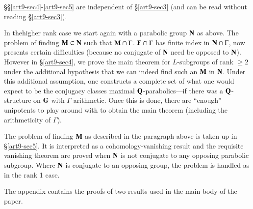\S \S \ref{art9-sec4}-\ref{art9-sec5} are independent of \S \ref{art9-sec3} (and can be read without reading \S \ref{art9-sec3}).

In the\pageoriginale higher rank case we start again with a parabolic group $\mathbf{N}$ as above. The problem of finding $\mathbf{M} \subset \mathbf{N}$ such that $\mathbf{M} \cap \Gamma$. $\mathbf{F} \cap \Gamma$ has finite index in $\mathbf{N} \cap \Gamma$, now presents certain difficulties (because no conjugate of $\mathbf{N}$ need be opposed to $\mathbf{N}$). However in \S \ref{art9-sec4},  we prove the main theorem for $L$-subgroups of rank $\geqslant 2$ under the additional hypothesis that we can indeed find such an $\mathbf{M}$ in $\mathbf{N}$. Under this additional assumption, one constructs a complete set of what one would expect to be the conjugacy classes maximal $\mathbf{Q}$-parabolics---if there was a $\mathbf{Q}$-structure on $\mathbf{G}$ with $\Gamma$ arithmetic. Once this is done, there are ``enough'' unipotents to play around with to obtain the main theorem (including the arithmeticity of $\Gamma$).

The problem of finding $\mathbf{M}$ as described in the paragraph above is taken up in \S \ref{art9-sec5}. It is interpreted as a cohomology-vanishing result and the requisite vanishing theorem are proved when $\mathbf{N}$ is not conjugate to any opposing parabolic subgroup. Where $\mathbf{N}$ is conjugate to an opposing group, the problem is handled as in the rank 1 case.

The appendix contains the proofs of two results used in the main body of the paper.

